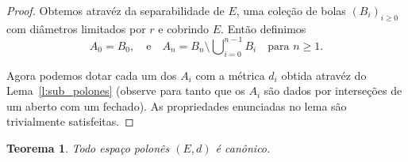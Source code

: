 \documentclass[reqno, final]{book}
\newcommand*\1{\mathds{1}}
\newtheorem{theorem}{Teorema}[section]
\DeclareMathOperator*{\mcup}{{\textstyle \bigcup}}
\begin{document}
\begin{proof}
  Obtemos atravéz da separabilidade de $E$, uma coleção de bolas $(B_i)_{i \geq 0}$ com diâmetros limitados por $r$ e cobrindo $E$.
  Então definimos
  \begin{equation}
    A_0 = B_0, \quad \text{e} \quad A_n = B_n \setminus \mcup_{i=0}^{n-1} B_i \quad \text{para $n \geq 1$.}
  \end{equation}

  Agora podemos dotar cada um dos $A_i$ com a métrica $d_i$ obtida atravéz do Lema~\ref{l:sub_polones} (observe para tanto que os $A_i$ são dados por interseções de um aberto com um fechado).
  As propriedades enunciadas no lema são trivialmente satisfeitas.
\end{proof}

\begin{theorem}
  Todo espaço polonês $(E, d)$ é canônico.
\end{theorem}
\end{document}
